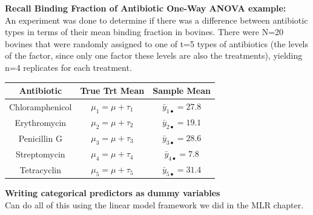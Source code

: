 \newpage

\textbf{Recall Binding Fraction of Antibiotic One-Way ANOVA example:}\\
An experiment was done to determine if there was a difference between antibiotic types in terms of their mean binding fraction in bovines.  There were N=20 bovines that were randomly assigned to one of t=5 types of antibiotics (the levels of the factor, since only one factor these levels are also the treatments), yielding n=4 replicates for each treatment.  
\begin{center}
\begin{tabular}{c|cc} 
Antibiotic& True Trt Mean & Sample Mean\\\hline
Chloramphenicol&$\mu_1=\mu+\tau_1$&$\bar{y}_{1\bullet}=27.8$\\
Erythromycin&$\mu_2=\mu+\tau_2$&$\bar{y}_{2\bullet}=19.1$\\
Penicillin G &$\mu_3=\mu+\tau_3$&$\bar{y}_{3\bullet}=28.6$\\
Streptomycin&$\mu_4=\mu+\tau_4$&$\bar{y}_{4\bullet}=7.8$\\
Tetracyclin&$\mu_5=\mu+\tau_5$&$\bar{y}_{5\bullet}=31.4$\\
\end{tabular}
\end{center}

\Large\textbf{Writing categorical predictors as dummy variables}\large\\
Can do all of this using the linear model framework we did in the MLR chapter.\\

